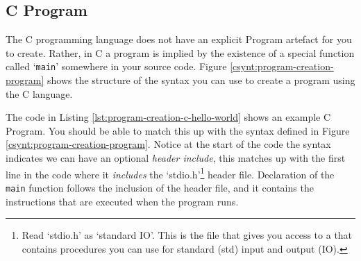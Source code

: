\clearpage
\subsection{C Program} %
\label{sub:program_in_c}

The C programming language does not have an explicit Program artefact for you to create. Rather, in C a program is implied by the existence of a special function called `\texttt{main}' somewhere in your source code. Figure \ref{csynt:program-creation-program} shows the structure of the syntax you can use to create a program using the C language.


The code in Listing \ref{lst:program-creation-c-hello-world} shows an example C Program. You should be able to match this up with the syntax defined in Figure \ref{csynt:program-creation-program}. Notice at the start of the code the syntax indicates we can have an optional \emph{header include}, this matches up with the first line in the code where it \emph{includes} the `stdio.h'\footnote{Read `stdio.h' as `standard IO'. This is the file that gives you access to a  that contains procedures you can use for standard (std) input and output (IO).} header file. Declaration of the \texttt{main} function follows the inclusion of the header file, and it contains the instructions that are executed when the program runs.



